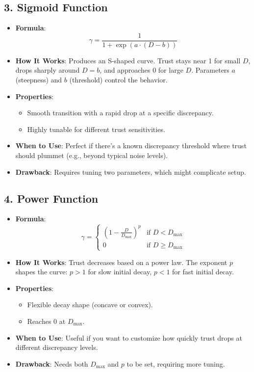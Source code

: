 \documentclass{article}
\begin{document}
\subsection*{3. Sigmoid Function}
\begin{itemize}
    \item \textbf{Formula}:
    \[
    \gamma = \frac{1}{1 + \exp\left(a \cdot (D - b)\right)}
    \]
    \item \textbf{How It Works}: Produces an S-shaped curve. Trust stays near 1 for small \(D\), drops sharply around \(D = b\), and approaches 0 for large \(D\). Parameters \(a\) (steepness) and \(b\) (threshold) control the behavior.
    \item \textbf{Properties}:
    \begin{itemize}
        \item Smooth transition with a rapid drop at a specific discrepancy.
        \item Highly tunable for different trust sensitivities.
    \end{itemize}
    \item \textbf{When to Use}: Perfect if there's a known discrepancy threshold where trust should plummet (e.g., beyond typical noise levels).
    \item \textbf{Drawback}: Requires tuning two parameters, which might complicate setup.
\end{itemize}

\subsection*{4. Power Function}
\begin{itemize}
    \item \textbf{Formula}:
    \[
    \gamma = 
    \begin{cases} 
    \left(1 - \frac{D}{D_{\text{max}}}\right)^p & \text{if } D < D_{\text{max}} \\
    0 & \text{if } D \geq D_{\text{max}}
    \end{cases}
    \]
    \item \textbf{How It Works}: Trust decreases based on a power law. The exponent \(p\) shapes the curve: \(p > 1\) for slow initial decay, \(p < 1\) for fast initial decay.
    \item \textbf{Properties}:
    \begin{itemize}
        \item Flexible decay shape (concave or convex).
        \item Reaches 0 at \(D_{\text{max}}\).
    \end{itemize}
    \item \textbf{When to Use}: Useful if you want to customize how quickly trust drops at different discrepancy levels.
    \item \textbf{Drawback}: Needs both \(D_{\text{max}}\) and \(p\) to be set, requiring more tuning.
\end{itemize}
\end{document}
